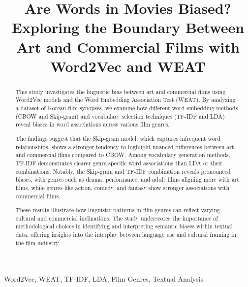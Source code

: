 \documentclass[conference]{IEEEtran}
\begin{document}
\title{Are Words in Movies Biased?\\
Exploring the Boundary Between Art and Commercial Films with Word2Vec and WEAT\\

}

\author{
}

\maketitle

\begin{abstract}
This study investigates the linguistic bias between art and commercial films using Word2Vec models and the Word Embedding Association Test (WEAT). By analyzing a dataset of Korean film synopses, we examine how different word embedding methods (CBOW and Skip-gram) and vocabulary selection techniques (TF-IDF and LDA) reveal biases in word associations across various film genres.

The findings suggest that the Skip-gram model, which captures infrequent word relationships, shows a stronger tendency to highlight nuanced differences between art and commercial films compared to CBOW. Among vocabulary generation methods, TF-IDF demonstrates clearer genre-specific word associations than LDA or their combinations. Notably, the Skip-gram and TF-IDF combination reveals pronounced biases, with genres such as drama, performance, and adult films aligning more with art films, while genres like action, comedy, and fantasy show stronger associations with commercial films.

These results illustrate how linguistic patterns in film genres can reflect varying cultural and commercial inclinations. The study underscores the importance of methodological choices in identifying and interpreting semantic biases within textual data, offering insights into the interplay between language use and cultural framing in the film industry.
\end{abstract}

\begin{IEEEkeywords}
Word2Vec, WEAT, TF-IDF, LDA, Film Genres, Textual Analysis
\end{IEEEkeywords}
\end{document}
